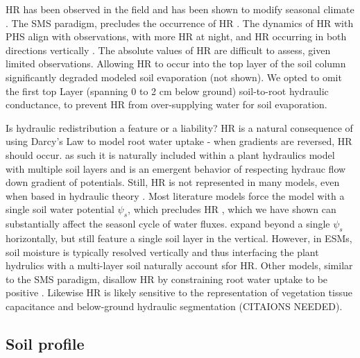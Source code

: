 \documentclass[draft,linenumbers]{agujournal}
\begin{document}
    HR has been observed in the field \citep{oliveira2005} and has been shown to modify seasonal climate \citep{lee2005}.
    The SMS paradigm, precludes the occurrence of HR \citep{oleson2013}.
    The dynamics of HR with PHS align with observations, with more HR at night, and HR occurring in both directions vertically \citep{burgess1998}.
    The absolute values of HR are difficult to assess, given limited observations.
    Allowing HR to occur into the top layer of the soil column significantly degraded modeled soil evaporation (not shown).
    We opted to omit the first top Layer (spanning 0 to 2 cm below ground) soil-to-root hydraulic conductance, to prevent HR from over-supplying water for soil evaporation.
    
    Is hydraulic redistribution a feature or a liability?
    HR is a natural consequence of using Darcy's Law to model root water uptake - when gradients are reversed, HR should occur. as such it is naturally included within a plant hydraulics model with multiple soil layers and is an emergent behavior of respecting hydrauc flow down gradient of potentials. 
    Still, HR is not represented in many models, even when based in hydraulic theory \citep{xu2016,christoffersen2016}.
    Most literature models force the model with a single soil water potential $\psi_s$, which precludes HR \citep{fisher2007,bonan2014,sperry2017}, which we have shown can substantially affect the seasonl cycle of water fluxes.
    \cite{christoffersen2016} expand beyond a single $\psi_s$ horizontally, but still feature a single soil layer in the vertical.
    However, in ESMs, soil moisture is typically resolved vertically and thus interfacing the plant hydrulics with a multi-layer soil naturally account sfor HR.
    Other models, similar to the SMS paradigm, disallow HR by constraining root water uptake to be positive \citep{xu2016}.
    Likewise HR is likely sensitive to the representation of vegetation tissue capacitance and below-ground hydraulic segmentation (CITAIONS NEEDED).

\subsection{Soil profile}
\end{document}

